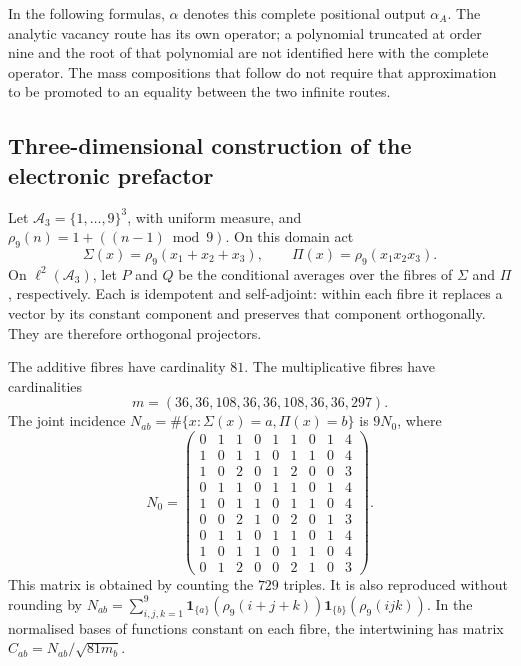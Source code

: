 In the following formulas, \(\alpha\) denotes this complete positional
output \(\alpha_A\). The analytic vacancy route has its own
operator; a polynomial truncated at order nine and the root of that polynomial
are not identified here with the complete operator. The mass
compositions that follow do not require that approximation to be promoted to an
equality between the two infinite routes.

\subsection{Three-dimensional construction of the electronic prefactor}
\label{vi:dep:prefactor}

Let \(\mathcal A_3=\{1,\ldots,9\}^3\), with uniform measure, and
\(\rho_9(n)=1+((n-1)\bmod9)\). On this domain act
\[
 \Sigma(x)=\rho_9(x_1+x_2+x_3),\qquad
 \Pi(x)=\rho_9(x_1x_2x_3).
\]
On \(\ell^2(\mathcal A_3)\), let \(P\) and \(Q\) be the conditional
averages over the fibres of \(\Sigma\) and \(\Pi\),
respectively. Each is idempotent and self-adjoint: within each
fibre it replaces a vector by its constant component and preserves
that component orthogonally. They are therefore orthogonal projectors.

The additive fibres have cardinality \(81\). The multiplicative fibres have
cardinalities
\[
m=(36,36,108,36,36,108,36,36,297).
\]
The joint incidence
\(N_{ab}=\#\{x:\Sigma(x)=a,\Pi(x)=b\}\) is \(9N_0\), where
\begin{equation}
 N_0=\begin{pmatrix}
0&1&1&0&1&1&0&1&4\\1&0&1&1&0&1&1&0&4\\
1&0&2&0&1&2&0&0&3\\0&1&1&0&1&1&0&1&4\\
1&0&1&1&0&1&1&0&4\\0&0&2&1&0&2&0&1&3\\
0&1&1&0&1&1&0&1&4\\1&0&1&1&0&1&1&0&4\\
0&1&2&0&0&2&1&0&3
\end{pmatrix}.
 \label{vi:dep:incidencia-cubica}
\end{equation}
This matrix is obtained by counting the \(729\) triples. It is also
reproduced without rounding by
\(N_{ab}=\sum_{i,j,k=1}^9
\mathbf1_{\{a\}}(\rho_9(i+j+k))
\mathbf1_{\{b\}}(\rho_9(ijk))\).
In the normalised bases of functions constant on each fibre, the
intertwining has matrix \(C_{ab}=N_{ab}/\sqrt{81m_b}\).

